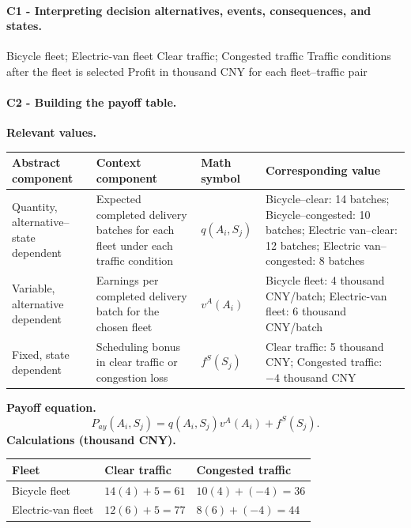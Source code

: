 	\paragraph*{C1 - Interpreting decision alternatives, events, consequences, and states.}
	\label{subsec:problem3-local-delivery-fleet-c1}
	\DecisionElementsTable
	{Bicycle fleet; Electric-van fleet}
	{Clear traffic; Congested traffic}
	{Traffic conditions after the fleet is selected}
	{Profit in thousand CNY for each fleet--traffic pair}
	
	
	\paragraph*{C2 - Building the payoff table.}
	\label{subsec:problem3-local-delivery-fleet-c2}
	\textbf{Relevant values.}
	\begin{center}
		\small
		\begin{tabularx}{\textwidth}{LLLL}
			\toprule
			Abstract component & Context component & Math symbol & Corresponding value \\
			\midrule
			Quantity, alternative--state dependent & Expected completed delivery batches for each fleet under each traffic condition & $q(A_i,S_j)$ & Bicycle--clear: 14 batches; Bicycle--congested: 10 batches; Electric van--clear: 12 batches; Electric van--congested: 8 batches \\
			Variable, alternative dependent & Earnings per completed delivery batch for the chosen fleet & $v^A(A_i)$ & Bicycle fleet: 4 thousand CNY/batch; Electric-van fleet: 6 thousand CNY/batch \\
			Fixed, state dependent & Scheduling bonus in clear traffic or congestion loss & $f^S(S_j)$ & Clear traffic: 5 thousand CNY; Congested traffic: $-4$ thousand CNY \\
			\bottomrule
		\end{tabularx}
	\end{center}
	\textbf{Payoff equation.}
	\[
		P_{ay}(A_i,S_j)=q(A_i,S_j)v^A(A_i)+f^S(S_j).
	\]
	\textbf{Calculations (thousand CNY).}
	\begin{center}
		\begin{tabularx}{\textwidth}{L>{\centering\arraybackslash}X>{\centering\arraybackslash}X}
			\toprule
			Fleet & Clear traffic & Congested traffic \\
			\midrule
			Bicycle fleet & $14(4)+5=61$ & $10(4)+(-4)=36$ \\
			Electric-van fleet & $12(6)+5=77$ & $8(6)+(-4)=44$ \\
			\bottomrule
		\end{tabularx}
	\end{center}
